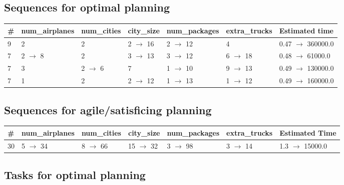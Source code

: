 \documentclass{article}
\begin{document}
                            \subsection*{Sequences for optimal planning}

                            \begin{center}
                            \begin{tabular}{@{}l|l|l|l|l|l|l@{}}
                            \# & num\_airplanes & num\_cities & city\_size & num\_packages & extra\_trucks & Estimated time\\\midrule
                            9&2&2&2 $\rightarrow$ 16&2 $\rightarrow$ 12&4&0.47 $\rightarrow$ 360000.0\\
7&2 $\rightarrow$ 8&2&3 $\rightarrow$ 13&3 $\rightarrow$ 12&6 $\rightarrow$ 18&0.48 $\rightarrow$ 61000.0\\
7&3&2 $\rightarrow$ 6&7&1 $\rightarrow$ 10&9 $\rightarrow$ 13&0.49 $\rightarrow$ 130000.0\\
7&1&2&2 $\rightarrow$ 12&1 $\rightarrow$ 13&1 $\rightarrow$ 12&0.49 $\rightarrow$ 160000.0
                            \end{tabular}
                            \end{center}
                    
                         \subsection*{Sequences for agile/satisficing planning}

                        \begin{center}
                        \begin{tabular}{@{}l|l|l|l|l|l|l@{}}
                        \# & num\_airplanes & num\_cities & city\_size & num\_packages & extra\_trucks & Estimated Time\\\midrule
                        30&5 $\rightarrow$ 34&8 $\rightarrow$ 66&15 $\rightarrow$ 32&3 $\rightarrow$ 98&3 $\rightarrow$ 14&1.3 $\rightarrow$ 15000.0
                        \end{tabular}
                        \end{center}
                    
                                \subsection*{Tasks for optimal planning}
                                
\end{document}
